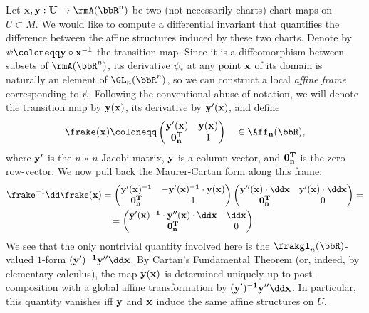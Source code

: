 \begin{example}
    Let $\bf{x},\bf{y}:U\to \rmA(\bbR^n)$ be two (not necessarily charts) chart maps on $U\subset M$. We would like to compute a differential invariant that quantifies the difference between the affine structures induced by these two charts. Denote by $\psi\coloneqq \bf{y}\circ \bf{x}^{-1}$ the transition map. Since it is a diffeomorphism between subsets of $\rmA(\bbR^n)$, its derivative $\psi_\ast$ at any point $\bf{x}$ of its domain is naturally an element of $\GL_n(\bbR^n)$, so we can construct a local \emph{affine frame} corresponding to $\psi$. Following the conventional abuse of notation, we will denote the transition map by $\bf{y}(\bf{x})$, its derivative by $\bf{y}'(\bf{x})$, and define
    \[\frake(\bf{x})\coloneqq \begin{pmatrix}
        \bf{y}'(\bf{x}) & \bf{y}(\bf{x}) \\
        \bf{0}_n^T & 1
    \end{pmatrix}\quad \in \Aff_n(\bbR),\]
    where $\bf{y}'$ is the $n\times n$ Jacobi matrix, $\bf{y}$ is a column-vector, and $\bf{0}_n^T$ is the zero row-vector. We now pull back the Maurer-Cartan form along this frame:
    \begin{multline}
        \frake^{-1}\dd\frake(\bf{x})=\begin{pmatrix}
            \bf{y}'(\bf{x})^{-1} & -\bf{y}'(\bf{x})^{-1}\cdot \bf{y}(\bf{x}) \\
            \bf{0}_n^T & 1
        \end{pmatrix}
        \begin{pmatrix}
            \bf{y}''(\bf{x})\cdot \dd \bf{x} & \bf{y}'(\bf{x})\cdot \dd \bf{x} \\
            \bf{0}_n^T & 0
        \end{pmatrix}=\\=
        \begin{pmatrix}
            \bf{y}'(\bf{x})^{-1}\cdot \bf{y}''(\bf{x})\cdot \dd \bf{x} & \dd \bf{x} \\
            \bf{0}_n^T & 0
        \end{pmatrix}.
    \end{multline}
    We see that the only nontrivial quantity involved here is the $\frakgl_n(\bbR)$-valued $1$-form $(\bf{y}')^{-1} \bf{y}'' \dd \bf{x}$. By Cartan's Fundamental Theorem (or, indeed, by elementary calculus), the map $\bf{y}(\bf{x})$ is determined uniquely up to post-composition with a global affine transformation by $(\bf{y}')^{-1} \bf{y}'' \dd \bf{x}$. In particular, this quantity vanishes iff $\bf{y}$ and $\bf{x}$ induce the same affine structures on $U$. 
    

\end{example}
